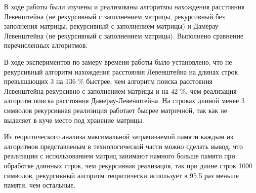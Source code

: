 \Conclusion
    В ходе работы были изучены и реализованы алгоритмы нахождения
    расстояния Левенштейна (не рекурсивный с заполнением матрицы,
    рекурсивный без заполнения матрицы, рекурсивный с заполнением матрицы)
    и Дамерау-Левенштейна (не рекурсивный с заполнением матрицы). 
    Выполнено сравнение перечисленных алгоритмов. 
    
    В ходе экспериментов по замеру времени работы было установлено, что не рекурсивный алгоритм нахождения расстояния Левенштейна
    на длинах строк превышающих 3 на 136 \% быстрее, чем алгоритм поиска
    расстояния Левенштейна рекурсивно с заполнением матрицы и на 42 \%,
    чем реализация алгоритм поиска расстояния Дамерау-Левенштейна. На строках
    длиной менее 3 символов рекурсивная реализиция работает бысрее матричной, так
    как не выделяет в куче место под хранение матрицы.
    
    Из теоритического анализа максимальной затрачиваемой памяти каждым из алгоритмов 
    представленым в технологической части можно сделать вывод, что реализации
    с использованием матриц занимают намного больше памяти при обработке
    длинных строк, чем рекурсивная реализация, так при длине строк 1000
    символов, рекурсивный алгоритм теоритически использует в 95.5 раз меньше памяти, чем остальные.
